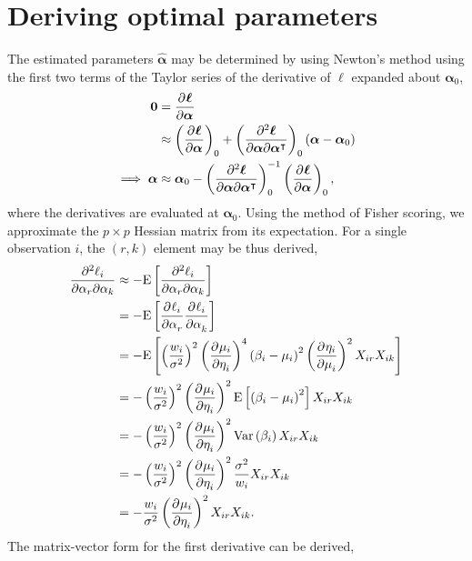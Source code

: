\section{Deriving optimal parameters}

The estimated parameters $\bm{\hat{\alpha}}$ may be determined by using Newton's method using the first two terms of the Taylor series of the derivative of $\bm{\ell}$ expanded about $\bm{\alpha}_0$,
\begin{align*}
  \mathbf{0} &= \frac{\partial^{} \bm{\ell}}{\partial \bm{\alpha}^{} } \\
  &\approx \left( \frac{\partial^{} \bm{\ell}}{\partial \bm{\alpha}^{} } \right)_0 + \left( \frac{\partial^2 \bm{\ell}}{\partial \bm{\alpha} \partial \bm{\alpha}^\intercal} \right)_0 \left( \bm{\alpha} - \bm{\alpha}_0 \right) \\
  \implies \bm{\alpha} &\approx \bm{\alpha}_0 - \left( \frac{\partial^2 \bm{\ell}}{\partial \bm{\alpha} \partial \bm{\alpha}^\intercal} \right)_0^{-1} \left( \frac{\partial^{} \bm{\ell}}{\partial \bm{\alpha}^{} } \right)_0,
\end{align*}
where the derivatives are evaluated at $\bm{\alpha}_0$.  Using the method of Fisher scoring, we approximate the $p \times p$ Hessian matrix from its expectation.  For a single observation $i$, the $(r,k)$ element may be thus derived,
\begin{align*}
  \frac{\partial^2 \ell_i}{\partial \alpha_r \partial \alpha_k} &\approx - \mathrm{E}\left[ \frac{\partial^2 \ell_i}{\partial \alpha_r \partial \alpha_k} \right] \\
  &= - \mathrm{E}\left[ \frac{\partial^{} \ell_i}{\partial \alpha_r^{} } \frac{\partial^{} \ell_i}{\partial \alpha_k^{} } \right] \\
  &= - \mathrm{E}\left[ \left( \frac{w_i}{\sigma^2} \right)^2 \left( \frac{\partial^{} \mu_i}{\partial \eta_i^{} } \right)^4 \left(\beta_i - \mu_i\right)^2 \left( \frac{\partial^{} \eta_i}{\partial \mu_i^{} } \right)^2 X_{ir} X_{ik} \right] \\
  &= - \left( \frac{w_i}{\sigma^2} \right)^2 \left( \frac{\partial^{} \mu_i}{\partial \eta_i^{} } \right)^2 \mathrm{E}\left[ \left(\beta_i - \mu_i\right)^2 \right] X_{ir} X_{ik} \\
  &= - \left( \frac{w_i}{\sigma^2} \right)^2 \left( \frac{\partial^{} \mu_i}{\partial \eta_i^{} } \right)^2 \mathrm{Var}\left(\beta_i\right) X_{ir} X_{ik} \\
  &= - \left( \frac{w_i}{\sigma^2} \right)^2 \left( \frac{\partial^{} \mu_i}{\partial \eta_i^{} } \right)^2 \frac{\sigma^2}{w_i} X_{ir} X_{ik} \\
  &= - \frac{w_i}{\sigma^2} \left( \frac{\partial^{} \mu_i}{\partial \eta_i^{} } \right)^2 X_{ir} X_{ik}.
\end{align*}
The matrix-vector form for the first derivative can be derived,

